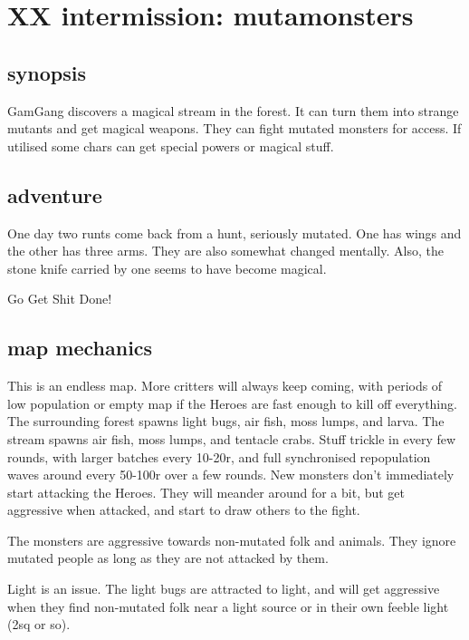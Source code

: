 \section*{XX intermission: mutamonsters}


\subsection*{synopsis}

GamGang discovers a magical stream in the forest. It can turn them into strange mutants and get magical weapons. They can fight mutated monsters for access. If utilised some chars can get special powers or magical stuff.


\subsection*{adventure}

One day two runts come back from a hunt, seriously mutated. One has wings and the other has three arms. They are also somewhat changed mentally. Also, the stone knife carried by one seems to have become magical.

\begin{readoutloud}
Go Get Shit Done!
\end{readoutloud}


\subsection*{map mechanics}

This is an endless map. More critters will always keep coming, with periods of low population or empty map if the Heroes are fast enough to kill off everything. The surrounding forest spawns light bugs, air fish, moss lumps, and larva. The stream spawns air fish, moss lumps, and tentacle crabs. Stuff trickle in every few rounds, with larger batches every 10-20r, and full synchronised repopulation waves around every 50-100r over a few rounds. New monsters don't immediately start attacking the Heroes. They will meander around for a bit, but get aggressive when attacked, and start to draw others to the fight.

The monsters are aggressive towards non-mutated folk and animals. They ignore mutated people as long as they are not attacked by them.

Light is an issue. The light bugs are attracted to light, and will get aggressive when they find non-mutated folk near a light source or in their own feeble light (2sq or so).


